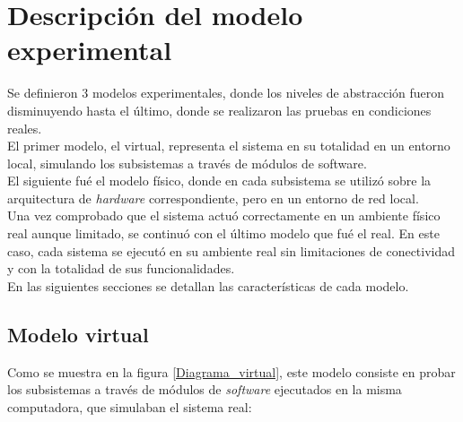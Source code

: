 
\chapter{Descripción del modelo experimental} %

\label{Chapter4} %


Se definieron 3 modelos experimentales, donde los niveles de abstracción fueron disminuyendo hasta el último, donde se realizaron las pruebas en condiciones reales.\\
El primer modelo, el virtual, representa el sistema en su totalidad en un entorno local, simulando los subsistemas a través de módulos de software.\\
El siguiente fué el modelo físico, donde en cada subsistema se utilizó sobre la arquitectura de \textit{hardware} correspondiente, pero en un entorno de red local.\\
Una vez comprobado que el sistema actuó correctamente en un ambiente físico real aunque limitado, se continuó con el último modelo que fué el real. En este caso, cada sistema se ejecutó en su ambiente real sin limitaciones de conectividad y con la totalidad de sus funcionalidades.\\
En las siguientes secciones se detallan las características de cada modelo.


\newpage



\section{Modelo virtual}

Como se muestra en la figura \ref{Diagrama_virtual}, este modelo consiste  en probar los subsistemas a través de módulos de \textit{software} ejecutados en la misma computadora, que simulaban el sistema real:\\

